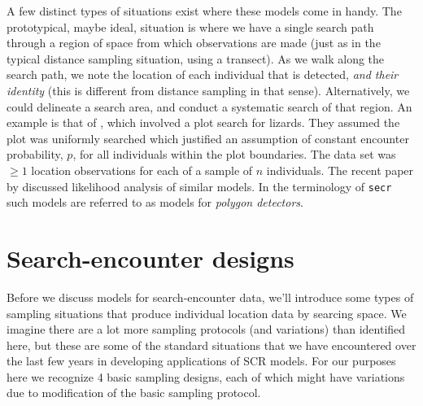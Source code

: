 A few distinct types of situations exist where these models come in
handy. The prototypical, maybe ideal, situation
\citet{royle_etal:2011mee} is where we have a single search path
through a region of space from which observations are made (just as in
the typical distance sampling situation, using a transect). As we walk
along the search path, we note the location of each individual that is
detected, {\it and their identity} (this is different from distance
sampling in that sense).  Alternatively, we could delineate a search
area, and conduct a systematic search of that region. An example is
that of \citet{royle_young:2008}, which involved a plot search for
lizards. They assumed the plot was uniformly searched which justified
an assumption of constant encounter probability, $p$, for all
individuals within the plot boundaries.  The data set was $\ge 1$
location observations for each of a sample of $n$ individuals.  The
recent paper by \citet{efford:2011} discussed likelihood analysis of
similar models. In the terminology of \mbox{\tt secr} such models are
referred to as models for {\it polygon detectors}.

\section{Search-encounter designs}

Before we discuss models for search-encounter data, we'll introduce some
types of sampling situations that produce individual location data
by searcing space.  We imagine there are a lot more sampling protocols
(and variations) than identified here, but these are some of the
standard situations that we have encountered over the last few years
in developing applications of SCR models.  For our purposes here we
recognize 4 basic sampling designs, each of which might have
variations due to modification of the basic sampling protocol.


